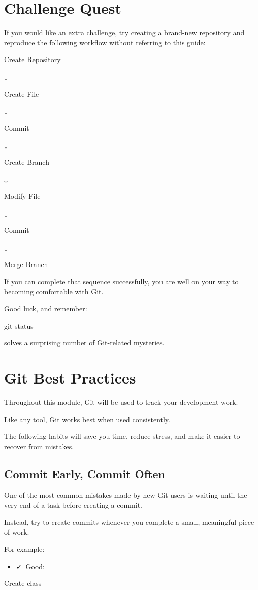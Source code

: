 \documentclass{csc2059practical}
\begin{document}
\section{Challenge Quest}
If you would like an extra challenge, try creating a brand-new repository and reproduce the following workflow without referring to this guide:

Create Repository

↓

Create File

↓

Commit

↓

Create Branch

↓

Modify File

↓

Commit

↓

Merge Branch

If you can complete that sequence successfully, you are well on your way to becoming comfortable with Git.

Good luck, and remember:

\begin{terminalplain}
git status
\end{terminalplain}
solves a surprising number of Git-related mysteries.

\section{Git Best Practices}
Throughout this module, Git will be used to track your development work.

Like any tool, Git works best when used consistently.

The following habits will save you time, reduce stress, and make it easier to recover from mistakes.

\subsection{Commit Early, Commit Often}
One of the most common mistakes made by new Git users is waiting until the very end of a task before creating a commit.

Instead, try to create commits whenever you complete a small, meaningful piece of work.

For example:

\begin{itemize}
  \item \faCheck\ Good:
\end{itemize}
Create class
\end{document}
